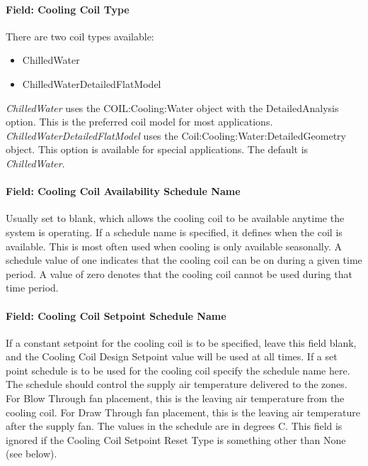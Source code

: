 \paragraph{Field: Cooling Coil Type}\label{field-cooling-coil-type-8}

There are two coil types available:

\begin{itemize}
\item
  ChilledWater
\item
  ChilledWaterDetailedFlatModel
\end{itemize}

\emph{ChilledWater} uses the COIL:Cooling:Water object with the DetailedAnalysis option. This is the preferred coil model for most applications. \emph{ChilledWaterDetailedFlatModel} uses the Coil:Cooling:Water:DetailedGeometry object. This option is available for special applications. The default is \emph{ChilledWater}.

\paragraph{Field: Cooling Coil Availability Schedule Name}\label{field-cooling-coil-availability-schedule-name-7}

Usually set to blank, which allows the cooling coil to be available anytime the system is operating. If a schedule name is specified, it defines when the coil is available. This is most often used when cooling is only available seasonally. A schedule value of one indicates that the cooling coil can be on during a given time period. A value of zero denotes that the cooling coil cannot be used during that time period.

\paragraph{Field: Cooling Coil Setpoint Schedule Name}\label{field-cooling-coil-setpoint-schedule-name}

If a constant setpoint for the cooling coil is to be specified, leave this field blank, and the Cooling Coil Design Setpoint value will be used at all times. If a set point schedule is to be used for the cooling coil specify the schedule name here. The schedule should control the supply air temperature delivered to the zones. For Blow Through fan placement, this is the leaving air temperature from the cooling coil. For Draw Through fan placement, this is the leaving air temperature after the supply fan. The values in the schedule are in degrees C. This field is ignored if the Cooling Coil Setpoint Reset Type is something other than None (see below).

